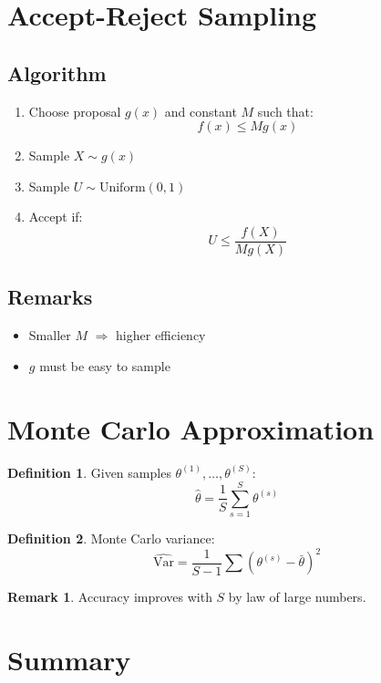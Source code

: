 \documentclass[12pt,oneside]{book}
\numberwithin{equation}{section}
\theoremstyle{definition}
\newtheorem{definition}{Definition}[section]
\newtheorem{remark}{Remark}[section]
\theoremstyle{plain}
\theoremstyle{remark}
\newcommand{\Var}{\mathrm{Var}}
\begin{document}
\section{Accept-Reject Sampling}

\subsection{Algorithm}

\begin{algorithm}
\begin{enumerate}
\item Choose proposal $g(x)$ and constant $M$ such that:
$$
f(x) \le M g(x)
$$
\item Sample $X \sim g(x)$
\item Sample $U \sim \text{Uniform}(0,1)$
\item Accept if:
$$
U \le \frac{f(X)}{M g(X)}
$$
\end{enumerate}
\end{algorithm}

\subsection{Remarks}

\begin{itemize}
\item Smaller $M$ $\Rightarrow$ higher efficiency
\item $g$ must be easy to sample
\end{itemize}

\section{Monte Carlo Approximation}

\begin{definition}
Given samples $\theta^{(1)}, \dots, \theta^{(S)}$:
$$
\hat{\theta}
=
\frac{1}{S}
\sum_{s=1}^S \theta^{(s)}
$$
\end{definition}

\begin{definition}
Monte Carlo variance:
$$
\widehat{\Var}
=
\frac{1}{S-1}
\sum (\theta^{(s)} - \bar{\theta})^2
$$
\end{definition}

\begin{remark}
Accuracy improves with $S$ by law of large numbers.  
\end{remark}

\section{Summary}
\end{document}
